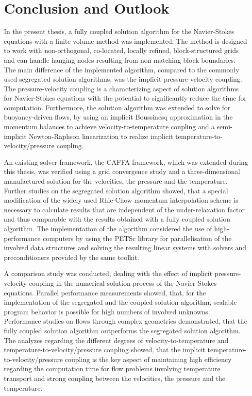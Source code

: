 \chapter{Conclusion and Outlook}
\label{sec:conclusion}

In the present thesis, a fully coupled solution algorithm for the Navier-Stokes equations with a finite-volume method was implemented. The method is designed to work with non-orthogonal, co-located, locally refined, block-structured grids and can handle hanging nodes resulting from non-matching block boundaries. The main difference of the implemented algorithm, compared to the commonly used segregated solution algorithms, was the implicit pressure-velocity coupling. The pressure-velocity coupling is a characterizing aspect of solution algorithms for Navier-Stokes equations with the potential to significantly reduce the time for computation. Furthermore, the solution algorithm was extended to solve for buoyancy-driven flows, by using an implicit Boussinesq approximation in the momentum balances to achieve velocity-to-temperature coupling and a semi-implicit Newton-Raphson linearization to realize implicit temperature-to-velocity/pressure coupling.

An existing solver framework, the CAFFA framework, which was extended during this thesis, was verified using a grid convergence study and a three-dimensional manufactured solution for the velocities, the pressure and the temperature. Further studies on the segregated solution algorithm showed, that a special modification of the widely used Rhie-Chow momentum interpolation scheme is necessary to calculate results that are independent of the under-relaxation factor and thus comparable with the results obtained with a fully coupled solution algorithm. The implementation of the algorithm considered the use of high-performance computers by using the PETSc library for parallelisation of the involved data structures and solving the resulting linear systems with solvers and preconditioners provided by the same toolkit.

A comparison study was conducted, dealing with the effect of implicit pressure-velocity coupling in the numerical solution process of the Navier-Stokes equations. Parallel performance measurements showed, that, for the implementation of the segregated and the coupled solution algorithm, scalable program behavior is possible for high numbers of involved unknowns. Performance studies on flows through complex geometries demonstrated, that the fully coupled solution algorithm outperforms the segregated solution algorithm. The analyzes regarding the different degrees of velocity-to-temperature and temperature-to-velocity/pressure coupling showed, that the implicit temperature-to-velocity/pressure coupling is the key aspect of maintaining high efficiency regarding the computation time for flow problems involving temperature transport and strong coupling between the velocities, the pressure and the temperature.

